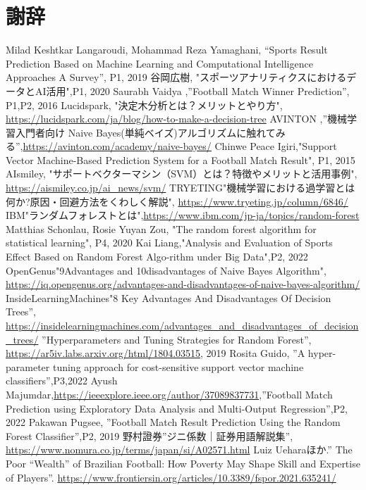 \documentclass[platex]{suribt}
\begin{document}
\backmatter%
\chapter{謝辞}%

\begin{thebibliography}{2}%
\bibitem{}
Milad Keshtkar Langaroudi, Mohammad Reza Yamaghani, “Sports Result Prediction Based on Machine Learning and Computational Intelligence Approaches A Survey”, P1, 2019
\bibitem{}
谷岡広樹, "スポーツアナリティクスにおけるデータとAI活用",P1, 2020
\bibitem{}
Saurabh Vaidya ,”Football Match Winner Prediction”, P1,P2, 2016
\bibitem{}
Lucidspark, "決定木分析とは？メリットとやり方", \url{https://lucidspark.com/ja/blog/how-to-make-a-decision-tree}
\bibitem{}
AVINTON ,”機械学習入門者向け Naive Bayes(単純ベイズ)アルゴリズムに触れてみる”,\url{https://avinton.com/academy/naive-bayes/}
\bibitem{}
Chinwe Peace Igiri,"Support Vector Machine-Based Prediction System for a Football Match Result", P1, 2015
\bibitem{}
AIsmiley, "サポートベクターマシン（SVM）とは？特徴やメリットと活用事例", \url{https://aismiley.co.jp/ai_news/svm/}
\bibitem{}
TRYETING"機械学習における過学習とは何か?原因・回避方法をくわしく解説", \url{https://www.tryeting.jp/column/6846/}
\bibitem{}
IBM"ランダムフォレストとは",\url{https://www.ibm.com/jp-ja/topics/random-forest}
\bibitem{}
Matthias Schonlau, Rosie Yuyan Zou, "The random forest algorithm for statistical learning", P4, 2020
\bibitem{}
Kai Liang,"Analysis and Evaluation of Sports Effect Based on Random Forest Algo-rithm under Big Data",P2, 2022
\bibitem{}
OpenGenus"9Advantages and 10disadvantages of Naive Bayes Algorithm", \url{https://iq.opengenus.org/advantages-and-disadvantages-of-naive-bayes-algorithm/}
\bibitem{}
InsideLearningMachines"8 Key Advantages And Disadvantages Of Decision Trees”, \url{https://insidelearningmachines.com/advantages_and_disadvantages_of_decision_trees/}
\bibitem{}
”Hyperparameters and Tuning Strategies for Random Forest”, \url{https://ar5iv.labs.arxiv.org/html/1804.03515}, 2019
\bibitem{}
Rosita Guido, ”A hyper-parameter tuning approach for cost-sensitive support vector machine classifiers”,P3,2022
\bibitem{}
Ayush Majumdar,\url{https://ieeexplore.ieee.org/author/37089837731},”Football Match Prediction using Exploratory Data Analysis and Multi-Output Regression”,P2, 2022
\bibitem{}
Pakawan Pugsee, ”Football Match Result Prediction Using the Random Forest Classifier”,P2, 2019
\bibitem{}
野村證券”ジニ係数｜証券用語解説集”, \url{https://www.nomura.co.jp/terms/japan/si/A02571.html}
\bibitem{}
Luiz Ueharaほか.” The Poor “Wealth” of Brazilian Football: How Poverty May Shape Skill and Expertise of Players”. \url{https://www.frontiersin.org/articles/10.3389/fspor.2021.635241/}


\end{thebibliography}
\appendix%
\chapter{}
\end{document}

